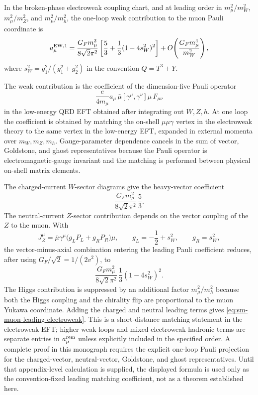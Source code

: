 \begin{controlledapproximation}
\label{ca:sm-muon-leading-electroweak}
In the broken-phase electroweak coupling chart, and at leading order in
\(m_\mu^2/m_W^2\), \(m_\mu^2/m_Z^2\), and \(m_\mu^2/m_h^2\), the one-loop weak
contribution to the muon Pauli coordinate is
\begin{equation}
  a_\mu^{\rm EW,1}
  =
  \frac{G_Fm_\mu^2}{8\sqrt2\pi^2}
  \left[
    \frac53+\frac13(1-4s_W^2)^2
  \right]
  +
  O\!\left(\frac{G_Fm_\mu^4}{m_W^2}\right),
  \label{eq:sm-muon-leading-electroweak}
\end{equation}
where \(s_W^2=g_1^2/(g_1^2+g_2^2)\) in the convention
\(Q=T^3+Y\).
\par
The weak contribution is the coefficient of the dimension-five Pauli operator
\begin{equation}
  \frac{e}{4m_\mu}a_\mu\,
  \bar\mu[\gamma^\mu,\gamma^\nu]\mu\,F_{\mu\nu}
  \label{eq:sm-muon-pauli-operator}
\end{equation}
in the low-energy QED EFT obtained after integrating out \(W,Z,h\).  At one
loop the coefficient is obtained by matching the on-shell
\(\mu\mu\gamma\) vertex in the electroweak theory to the same vertex in the
low-energy EFT, expanded in external momenta over \(m_W,m_Z,m_h\).
Gauge-parameter dependence cancels in the sum of vector, Goldstone, and ghost
representatives because the Pauli operator is electromagnetic-gauge invariant
and the matching is performed between physical on-shell matrix elements.

The charged-current \(W\)-sector diagrams give the heavy-vector coefficient
\begin{equation}
  \frac{G_Fm_\mu^2}{8\sqrt2\pi^2}\,\frac53 .
  \label{eq:sm-muon-w-coefficient}
\end{equation}
The neutral-current \(Z\)-sector contribution depends on the vector coupling
of the \(Z\) to the muon.  With
\[
  J_Z^\mu
  =
  \bar\mu\gamma^\mu
  \bigl(g_LP_L+g_RP_R\bigr)\mu,
  \qquad
  g_L=-\frac12+s_W^2,\qquad g_R=s_W^2,
\]
the vector-minus-axial combination entering the leading Pauli coefficient
reduces, after using \(G_F/\sqrt2=1/(2v^2)\), to
\begin{equation}
  \frac{G_Fm_\mu^2}{8\sqrt2\pi^2}\,
  \frac13(1-4s_W^2)^2 .
  \label{eq:sm-muon-z-coefficient}
\end{equation}
The Higgs contribution is suppressed by an additional factor
\(m_\mu^2/m_h^2\) because both the Higgs coupling and the chirality flip are
proportional to the muon Yukawa coordinate.  Adding the charged and neutral
leading terms gives \eqref{eq:sm-muon-leading-electroweak}.  This is a
short-distance matching statement in the electroweak EFT; higher weak loops
and mixed electroweak-hadronic terms are separate entries in
\(a_\mu^{\rm rem}\) unless explicitly included in the specified order.
A complete proof in this monograph requires the explicit one-loop Pauli
projection for the charged-vector, neutral-vector, Goldstone, and ghost
representatives.  Until that appendix-level calculation is supplied, the
displayed formula is used only as the convention-fixed leading matching
coefficient, not as a theorem established here.
\end{controlledapproximation}

